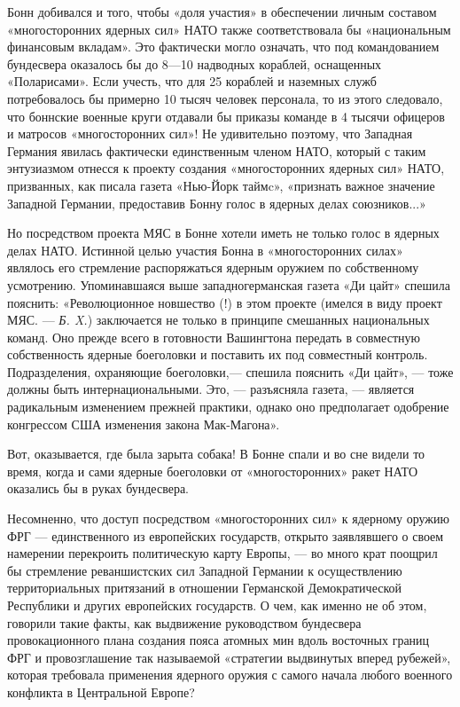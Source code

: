 \documentclass[12pt, a4paper, openany]{book}
\begin{document}
	Бонн добивался и того, чтобы «доля участия» в обеспечении личным составом «многосторонних ядерных сил» НАТО также соответствовала бы «национальным финансовым вкладам». Это фактически могло означать, что под командованием бундесвера оказалось бы до 8—10 надводных кораблей, оснащенных «Поларисами». Если учесть, что для 25 кораблей и наземных служб потребовалось бы примерно 10 тысяч человек персонала, то из этого следовало, что боннские военные круги отдавали бы приказы команде в 4 тысячи офицеров и матросов «многосторонних сил»! Не удивительно поэтому, что Западная Германия явилась фактически единственным членом НАТО, который с таким энтузиазмом отнесся к проекту создания «многосторонних ядерных сил» НАТО, призванных, как писала газета «Нью-Йорк таймc», «признать важное значение Западной Германии, предоставив Бонну голос в ядерных делах союзников...»
	
	Но посредством проекта МЯС в Бонне хотели иметь не только голос в ядерных делах НАТО. Истинной целью участия Бонна в «многосторонних силах» являлось его стремление распоряжаться ядерным оружием по собственному усмотрению. Упоминавшаяся выше западногерманская газета «Ди цайт» спешила пояснить: «Революционное новшество (!) в этом проекте (имелся в виду проект МЯС. — \textit{Б. X.}) заключается не только в принципе смешанных национальных команд. Оно прежде всего в готовности Вашингтона передать в совместную собственность ядерные боеголовки и поставить их под совместный контроль. Подразделения, охраняющие боеголовки,— спешила пояснить «Ди цайт», — тоже должны быть интернациональными. Это, — разъясняла газета, — является радикальным изменением прежней практики, однако оно предполагает одобрение конгрессом США изменения закона Мак-Магона».
	
	Вот, оказывается, где была зарыта собака! В Бонне спали и во сне видели то время, когда и сами ядерные боеголовки от «многосторонних» ракет НАТО оказались бы в руках бундесвера.
	
	Несомненно, что доступ посредством «многосторонних сил» к ядерному оружию ФРГ — единственного из европейских государств, открыто заявлявшего о своем намерении перекроить политическую карту Европы, — во много крат поощрил бы стремление реваншистских сил Западной Германии к осуществлению территориальных притязаний в отношении Германской Демократической Республики и других европейских государств. О чем, как именно не об этом, говорили такие факты, как выдвижение руководством бундесвера провокационного плана создания пояса атомных мин вдоль восточных границ ФРГ и провозглашение так называемой «стратегии выдвинутых вперед рубежей», которая требовала применения ядерного оружия с самого начала любого военного конфликта в Центральной Европе?
	
\end{document}

